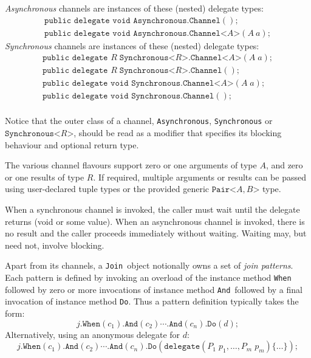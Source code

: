 \documentclass{article}
\newcommand{\cjoin}{{\texttt{Join}}}
\newcommand{\dasync}{{\texttt{Asynchronous.Channel}}}
\newcommand{\dasyncA}[1]{{\texttt{Asynchronous.Channel<}#1\texttt{>}}}
\newcommand{\dsyncvoidA}[1]{{\texttt{Synchronous.Channel<}#1\texttt{>}}}
\newcommand{\dsyncvoid}{{\texttt{Synchronous.Channel}}}
\newcommand{\dsyncR}[1]{{\texttt{Synchronous<}#1\texttt{>.Channel}}}
\newcommand{\dsyncRA}[2]{{\texttt{Synchronous<}#1\texttt{>.Channel<}#2\texttt{>}}}
\newcommand{\cpair}[2]{{\texttt{Pair<}#1,#2\texttt{>}}}
\newcommand{\dotwhen}{\texttt{.When}}
\newcommand{\dotand}{\texttt{.And}}
\newcommand{\dotdo}{\texttt{.Do}}
\newcommand{\When}{\texttt{When}}
\newcommand{\And}{\texttt{And}}
\newcommand{\Do}{\texttt{Do}}
\newcommand{\channel}{\ensuremath{c}}
\newcommand{\joinobj}{\ensuremath{j}}
\newcommand{\delegate}{\ensuremath{d}}
\newcommand{\delegatekw}{\texttt{delegate}}
\newcommand{\tvara}{\ensuremath{A}}
\newcommand{\tvarb}{\ensuremath{B}}
\newcommand{\tvarr}{\ensuremath{R}}
\begin{document}
\emph{Asynchronous} channels are instances of these (nested) delegate types: %
\[ 
\begin{array}{l}
  \texttt{public delegate void } \dasync();\\
  \texttt{public delegate void } \dasyncA{\tvara}(\tvara\ a);
\end{array}
\]
\emph{Synchronous} channels are instances of  these (nested) delegate types: %
\[ 
\begin{array}{l}
  \texttt{public delegate } \tvarr\; \dsyncRA{\tvarr}{\tvara}(\tvara\;a);\\
  \texttt{public delegate } \tvarr\; \dsyncR{\tvarr}();\\
  \texttt{public delegate void } \dsyncvoidA{\tvara}(\tvara\;a);\\
  \texttt{public delegate void } \dsyncvoid();\\
\end{array}
\]

Notice that the outer class of a channel, \texttt{Asynchronous}, \texttt{Synchronous} or $\texttt{Synchronous<}$\tvarr$\texttt{>}$,
should be read as a modifier that specifies its blocking behaviour and optional return type.

The various channel flavours support zero or one arguments of type \texttt\tvara, and zero or one results of type \texttt\tvarr.
If required, multiple arguments or results can be passed using user-declared tuple types or the provided generic
$\cpair{\tvara}{\tvarb}$ type.

When a synchronous channel is invoked, the caller
must wait until the delegate returns (void or some value). 
When an asynchronous channel is invoked, there is no result and the
caller proceeds immediately without waiting. Waiting  may, but need not, involve blocking.

Apart from its channels, a \cjoin\ object notionally owns a set of \emph{join patterns}. Each pattern is defined by invoking an overload of 
the instance method \When\, followed by zero or more invocations of instance method \And\, followed by 
a final invocation of instance method \Do. Thus a pattern definition typically takes the form:
\[
  \joinobj\dotwhen(\channel_1)\dotand(\channel_2) \cdots \dotand(\channel_n)\dotdo(\delegate);
\]
Alternatively, using an anonymous delegate for \delegate: 
\[
  \joinobj\dotwhen(\channel_1)\dotand(\channel_2) \cdots \dotand(\channel_n)\dotdo(\delegatekw(P_1\;p_1, \ldots, P_m\;p_m)\{\ldots\});
\]
\end{document}
